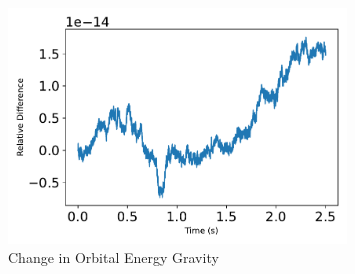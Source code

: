 \begin{figure}[htbp]\centerline{\includegraphics[width=0.8\textwidth]{AutoTeX/ChangeInOrbitalEnergyGravity}}\caption{Change in Orbital Energy Gravity}\label{fig:ChangeInOrbitalEnergyGravity}\end{figure}